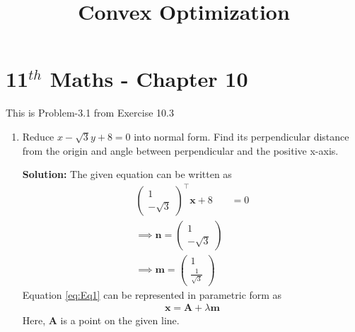 \documentclass[12pt]{article}
\newcommand{\solution}{\noindent \textbf{Solution: }}
\newcommand{\myvec}[1]{\ensuremath{\begin{pmatrix}#1\end{pmatrix}}}
\let\vec\mathbf
\begin{document}
\begin{center}
\title{\textbf{Convex Optimization}}
\date{\vspace{-5ex}} %
\maketitle
\end{center}
\setcounter{page}{1}

\section{11$^{th}$ Maths - Chapter 10}
This is Problem-3.1 from Exercise 10.3 
\begin{enumerate}
\item Reduce $x-\sqrt{3}y+8=0$ into normal form. Find its perpendicular distance from the origin and angle between perpendicular and the positive x-axis. 

\solution 
The given equation can be written as
\begin{align}
	\label{eq:Eq1}
	\myvec{1 \\ -\sqrt{3}}^\top\vec{x}+8 &= 0 \\
	\implies \vec{n} = \myvec{1 \\ -\sqrt{3}} \\
	\implies \vec{m} = \myvec{1 \\ \frac{1}{\sqrt{3}}}
\end{align}
Equation \eqref{eq:Eq1} can be represented in parametric form as
\begin{align}
	\label{eq:Eq2}
	\vec{x} = \vec{A}+\lambda\vec{m}
\end{align}
Here, $\vec{A}$ is a point on the given line. 


\end{enumerate}
\end{document}
